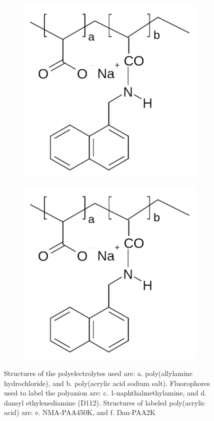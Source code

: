 \documentclass[journal=jacsat,manuscript=article]{achemso}
\begin{document}
\begin{figure}[H]
\begin{subfigure}[b]{0.3\textwidth}
        \includegraphics[scale=0.5]{fig1E.png}
        \caption{}
        \label{fig:E}
    \end{subfigure}
    \begin{subfigure}[b]{0.3\textwidth}
        \includegraphics[scale=0.5]{fig1E.png}
        \caption{}
        \label{fig:f}
    \end{subfigure}
    \caption{Structures of the polyelectrolytes used are: a. poly(allylamine hydrochloride), and b. poly(acrylic acid sodium salt).  Fluorophores used to label the polyanion are: c. 1-naphthalmethylamine, and d. dansyl ethylenediamine (D112).  Structures of labeled poly(acrylic acid) are: e. NMA-PAA450K, and f. Dan-PAA2K }
\end{figure}
\end{document}
